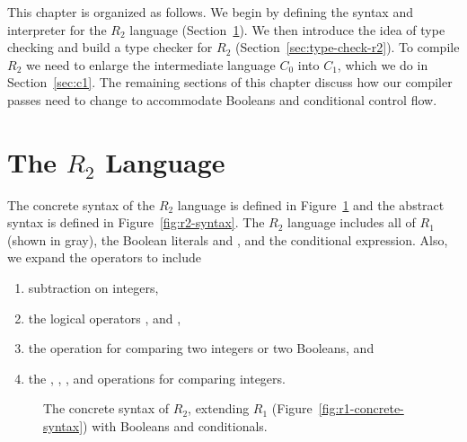 \documentclass[11pt]{book}
\newcommand{\gray}[1]{{\color{gray} #1}}
\begin{document}
This chapter is organized as follows.  We begin by defining the syntax
and interpreter for the $R_2$ language (Section~\ref{sec:r2-lang}). We
then introduce the idea of type checking and build a type checker for
$R_2$ (Section~\ref{sec:type-check-r2}). To compile $R_2$ we need to
enlarge the intermediate language $C_0$ into $C_1$, which we do in
Section~\ref{sec:c1}. The remaining sections of this chapter discuss
how our compiler passes need to change to accommodate Booleans and
conditional control flow.


\section{The $R_2$ Language}
\label{sec:r2-lang}

The concrete syntax of the $R_2$ language is defined in
Figure~\ref{fig:r2-concrete-syntax} and the abstract syntax is defined
in Figure~\ref{fig:r2-syntax}. The $R_2$ language includes all of
$R_1$ (shown in gray), the Boolean literals  and ,
and the conditional  expression. Also, we expand the
operators to include
\begin{enumerate}
\item subtraction on integers,
\item the logical operators ,  and ,
\item the  operation for comparing two integers or two Booleans, and
\item the \key{<}, \key{<=}, \key{>}, and \key{>=} operations for
  comparing integers.
\end{enumerate}

\begin{figure}[tp]
\centering
\fbox{
\begin{minipage}{0.96\textwidth}
\[
\begin{array}{lcl}
  \itm{bool} &::=& \key{\#t} \mid \key{\#f} \\  
  \itm{cmp} &::= & \key{eq?} \mid \key{<} \mid \key{<=} \mid \key{>} \mid \key{>=} \\
  \Exp &::=& \gray{ \Int \mid (\key{read}) \mid (\key{-}\;\Exp) \mid (\key{+} \; \Exp\;\Exp) }  \mid (\key{-}\;\Exp\;\Exp) \\
     &\mid&  \gray{ \Var \mid (\key{let}~([\Var~\Exp])~\Exp) } \\
     &\mid& \itm{bool}
      \mid (\key{and}\;\Exp\;\Exp) \mid (\key{or}\;\Exp\;\Exp)
      \mid (\key{not}\;\Exp) \\
      &\mid& (\itm{cmp}\;\Exp\;\Exp) \mid (\key{if}~\Exp~\Exp~\Exp) \\
  R_2 &::=& \Exp
\end{array}
\]
\end{minipage}
}
\caption{The concrete syntax of $R_2$, extending $R_1$
  (Figure~\ref{fig:r1-concrete-syntax}) with Booleans and conditionals.}
\label{fig:r2-concrete-syntax}
\end{figure}
\end{document}
